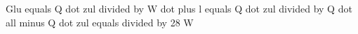 Glu equals Q dot zul divided by W dot plus l equals Q dot zul divided by Q dot all minus Q dot zul equals divided by 28 W